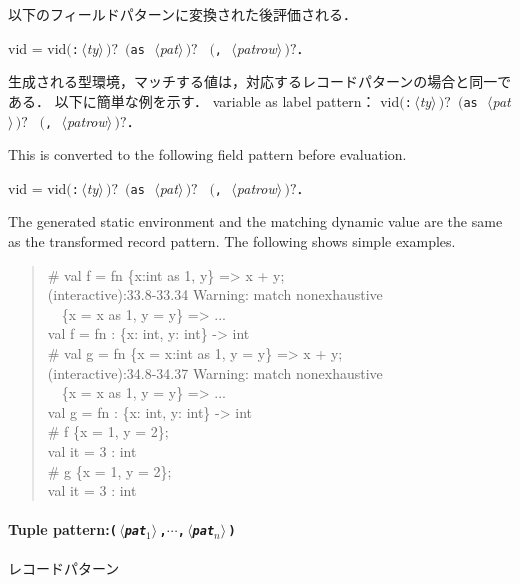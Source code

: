 \documentclass{jbook}
\newcommand{\txt}[2]{#2}
\newcommand{\nonterm}[1]{\mbox{$\,\langle$}{\it #1}\mbox{$\rangle\,$}}
\newcommand{\term}[1]{\mbox{{\tt #1}}}
\newcommand{\optional}[1]{\mbox{$($}{\protect #1}\mbox{$)?$}}
\newcommand{\myem}{\mbox{\ \ }}
\newenvironment{program}{\begin{quote}\begin{tt}}%
                        {\end{tt}\end{quote}}
\begin{document}
\begin{itemize}
以下のフィールドパターンに変換された後評価される．

\begin{center}
vid = vid\optional{\term{:}\nonterm{ty}}\ \optional{\term{as}\ \nonterm{pat}} 
\ \optional{\term{,}\ \nonterm{patrow}}．
\end{center}

	生成される型環境，マッチする値は，対応するレコードパターンの場合と同一である．
	以下に簡単な例を示す．
\else%
variable as label pattern：
vid\optional{\term{:}\nonterm{ty}}\ \optional{\term{as}\ \nonterm{pat}}
\ \optional{\term{,}\ \nonterm{patrow}}．

This is converted to the following field pattern before evaluation.

\begin{center}
vid = vid\optional{\term{:}\nonterm{ty}}\ \optional{\term{as}\ \nonterm{pat}} 
\ \optional{\term{,}\ \nonterm{patrow}}．
\end{center}

	The generated static environment and the matching dynamic value
are the same as the transformed record pattern.
	The following shows simple examples.
\fi%
\end{itemize}	

\begin{program}
\# val f = fn \{x:int as 1, y\} => x + y;
\\
(interactive):33.8-33.34 Warning: match nonexhaustive
\\
\myem      \{x = x as 1, y = y\} => ...
\\
val f = fn : \{x: int, y: int\} -> int
\\
\# val g = fn \{x = x:int as 1, y = y\} => x + y;
\\
(interactive):34.8-34.37 Warning: match nonexhaustive
\\
\myem      \{x = x as 1, y = y\} => ...
\\
val g = fn : \{x: int, y: int\} -> int
\\
\# f \{x = 1, y = 2\};
\\
val it = 3 : int
\\
\# g \{x = 1, y = 2\};
\\
val it = 3 : int
\end{program}


\paragraph{\txt{組パターン}{Tuple pattern}:\term{(\nonterm{pat$_1$},$\cdots$,\nonterm{pat$_n$})}}
\ifjp%
	レコードパターン
\end{document}
